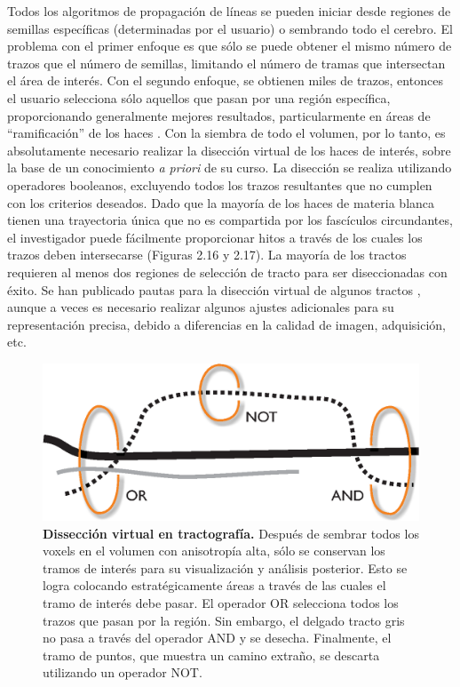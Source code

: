 \documentclass[12pt,a5,twoside]{book}
\begin{document}
Todos los algoritmos de propagación de líneas se pueden iniciar desde regiones de semillas específicas (determinadas por el usuario) o sembrando todo el cerebro. El problema con el primer enfoque es que sólo se puede obtener el mismo número de trazos que el número de semillas, limitando el número de tramas que intersectan el área de interés. Con el segundo enfoque, se obtienen miles de trazos, entonces el usuario selecciona sólo aquellos que pasan por una región específica, proporcionando generalmente mejores resultados, particularmente en áreas de ``ramificación'' de los haces \citep{Conturo_1999}. Con la siembra de todo el volumen, por lo tanto, es absolutamente necesario realizar la disección virtual de los haces de interés, sobre la base de un conocimiento {\it a priori} de su curso. La disección se realiza utilizando operadores booleanos, excluyendo todos los trazos resultantes que no cumplen con los criterios deseados. Dado que la mayoría de los haces de materia blanca tienen una trayectoria única que no es compartida por los fascículos circundantes, el investigador puede fácilmente proporcionar hitos a través de los cuales los trazos deben intersecarse (Figuras 2.16 y 2.17). La mayoría de los tractos requieren al menos dos regiones de selección de tracto para ser diseccionadas con éxito. Se han publicado pautas para la disección virtual de algunos tractos \citep{Catani_2002,Wakana_2007}, aunque a veces es necesario realizar algunos ajustes adicionales para su representación precisa, debido a diferencias en la calidad de imagen, adquisición, etc.

\begin{figure}
	\centering
    \includegraphics [scale=0.8,center] {DTI_dissection.eps}
    \caption{\textbf{Dissección virtual en tractografía.} Después de sembrar todos los voxels en el volumen con anisotropía alta, sólo se conservan los tramos de interés para su visualización y análisis posterior. Esto se logra colocando estratégicamente áreas a través de las cuales el tramo de interés debe pasar. El operador OR selecciona todos los trazos que pasan por la región. Sin embargo, el delgado tracto gris no pasa a través del operador AND y se desecha. Finalmente, el tramo de puntos, que muestra un camino extraño, se descarta utilizando un operador NOT.}
    \label{F:DTI_dissection}
\end{figure}
\end{document}
